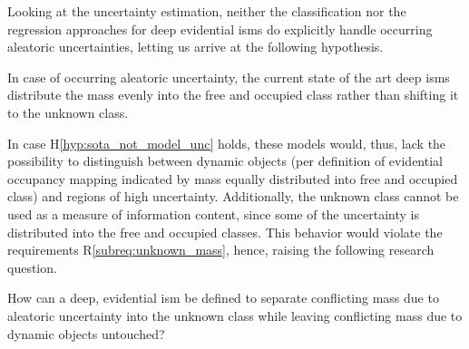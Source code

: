 Looking at the uncertainty estimation, neither the classification nor the regression approaches for deep evidential \gls{ism}s do explicitly handle occurring aleatoric uncertainties, letting us arrive at the following hypothesis.
\\
\begin{hyp} \label{hyp:sota_not_model_unc}
	In case of occurring aleatoric uncertainty, the current state of the art deep \gls{ism}s distribute the mass evenly into the free and occupied class rather than shifting it to the unknown class. 
\end{hyp}
In case H\ref{hyp:sota_not_model_unc} holds, these models would, thus, lack the possibility to distinguish between dynamic objects (per definition of evidential occupancy mapping indicated by mass equally distributed into free and occupied class) and regions of high uncertainty. Additionally, the unknown class cannot be used as a measure of information content, since some of the uncertainty is distributed into the free and occupied classes. This behavior would violate the requirements R\ref{subreq:unknown_mass}, hence, raising the following research question. 
\\
\begin{requ} \label{requ:how_to_sep_uncertainty}
	How can a deep, evidential \gls{ism} be defined to separate conflicting mass due to aleatoric uncertainty into the unknown class while leaving conflicting mass due to dynamic objects untouched?
\end{requ}
%
